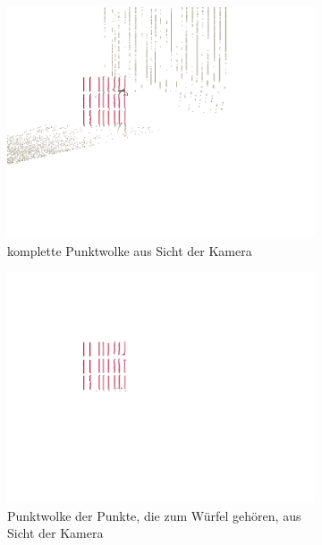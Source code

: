 \documentclass[ngerman,a4paper,parskip=half]{scrartcl}
\begin{document}
\begin{figure}[H]
	\centering
	\begin{subfigure}{0.45\textwidth}
		\includegraphics[width=\textwidth]{includes/diff_red_cam.png}
		\caption{komplette Punktwolke aus Sicht der Kamera}
	\end{subfigure}
	\hfill
	\begin{subfigure}{0.45\textwidth}
		\includegraphics[width=\textwidth]{includes/diff_only_red_cam.png}
		\caption{Punktwolke der Punkte, die zum Würfel gehören, aus Sicht der Kamera}
	\end{subfigure}
	\begin{subfigure}{0.45\textwidth}

\end{subfigure}
\end{figure}
\end{document}
